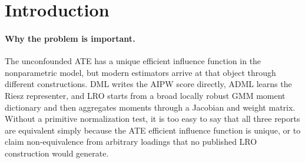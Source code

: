 \documentclass[11pt]{article}
\newcommand{\transpose}{\mathsf{T}}
\theoremstyle{definition}
\theoremstyle{plain}
\theoremstyle{remark}
\begin{document}
\begin{abstract}
Double machine learning, locally robust semiparametric GMM, and automatic DML
can all target the unconfounded binary ATE, but this common target does not make
every locally robust GMM normalization first-order report-equivalent to the DML
AIPW or ADML Riesz score.  This pivot asks for a primitive characterization of
which CEINR-admissible LRO dictionaries, Jacobians, and GMM weights reproduce
the ATE Riesz representer before collapsing the comparison to the already-known
canonical-gradient uniqueness theorem.  The flagship conjecture states that an
ATE-specialized LRO report is DML/ADML-equivalent exactly when its full-report
Gram certificate \(\Xi_J(P)=(U_J,S_J,T_J)\) vanishes: the aggregated
nonresidual component must equal \(m_1(X)-m_0(X)-\theta_0\), the dictionary must
span the ATE Riesz direction in \(L^2(\nu_P)\), and the published
\((A_J^\transpose W_JA_J)^{-1}A_J^\transpose W_J\) aggregation row must select a
Riesz coefficient vector.  A second conjecture asks for a relatively open
CEINR-admissible overidentified finite-support class, with an explicit two-cell
witness, where the plug-in and span checks hold but alignment fails, producing
an auditable influence-function and variance-report separation.  Resolving the proposal
would tell applied users when LRO, DML, and
ADML standard errors are interchangeable and when the chosen LRO normalization
must be reported as a different first-order object.
\end{abstract}

\section{Introduction}
\paragraph{Why the problem is important.}
The unconfounded ATE has a unique efficient influence function in the
nonparametric model, but modern estimators arrive at that object through
different constructions.  DML writes the AIPW score directly, ADML learns the
Riesz representer, and LRO starts from a broad locally robust GMM moment
dictionary and then aggregates moments through a Jacobian and weight matrix.
Without a primitive normalization test, it is too easy to say that all three
reports are equivalent simply because the ATE efficient influence function is
unique, or to claim non-equivalence from arbitrary loadings that no published
LRO construction would generate.
\end{document}

